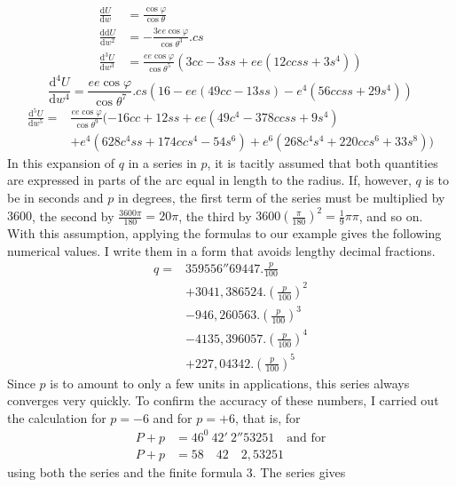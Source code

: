 \[
\begin{aligned}
\frac{\mathrm{d}U}{\mathrm{d}w}&=\frac{\cos\varphi}{\cos\theta}\\
\frac{\mathrm{dd}U}{\mathrm{d}w^2}&=-\frac{3ee\cos\varphi}{\cos\theta^3}\mathord{.}cs\\
\frac{\mathrm{d}^3U}{\mathrm{d}w^3}&=\frac{ee\cos\varphi}{\cos\theta^5}(3cc-3ss+ee(12ccss+3s^4))
\end{aligned}
\]
\[
\frac{\mathrm{d}^4U}{\mathrm{d}w^4}=\frac{ee\cos\varphi}{\cos\theta^7}\mathord{.}cs(16-ee(49cc-13ss)-e^4(56ccss+29s^4))
\]
\[
\begin{aligned}
\frac{\mathrm{d}^5U}{\mathrm{d}w^5}={}&\frac{ee\cos\varphi}{\cos\theta^9}(-16cc+12ss+ee(49c^4-378ccss+9s^4)\\
&+e^4(628c^4ss+174ccs^4-54s^6)+e^6(268c^4s^4+220ccs^6+33s^8))
\end{aligned}
\]
\indent In this expansion of \(q\) in a series in \(p\), it is tacitly assumed that both quantities are expressed in parts of the arc equal in length to the radius. If, however, \(q\) is to be in seconds and \(p\) in degrees, the first term of the series must be multiplied by \(3600\), the second by \(\tfrac{3600\pi}{180}=20\pi\), the third by \(3600(\tfrac{\pi}{180})^2=\tfrac{1}{9}\pi\pi\), and so on. With this assumption, applying the formulas to our example gives the following numerical values. I write them in a form that avoids lengthy decimal fractions.
\[
\begin{aligned}
q={}&359556''69447\mathord{.}\frac{p}{100}\\
&+3041{,}386524\mathord{.}(\frac{p}{100})^2\\
&-946{,}260563\mathord{.}(\frac{p}{100})^3\\
&-4135{,}396057\mathord{.}(\frac{p}{100})^4\\
&+227{,}04342\mathord{.}(\frac{p}{100})^5
\end{aligned}
\]
Since \(p\) is to amount to only a few units in applications, this series always converges very quickly. To confirm the accuracy of these numbers, I carried out the calculation for \(p=-6\) and for \(p=+6\), that is, for
\[
\begin{aligned}
P+p&=46^0\ 42'\ 2''53251\quad\text{and for}\\
P+p&=58\quad42\quad2{,}53251
\end{aligned}
\]
using both the series and the finite formula 3. The series gives

